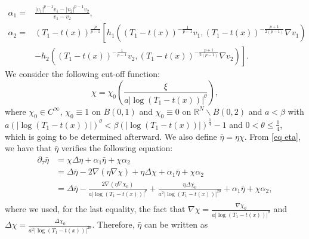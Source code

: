 \documentclass[11pt,a4paper]{article}
\newcommand{\1}{\mathbbm{1}}
\numberwithin{equation}{section}
\newcommand{\numberset}{\mathbb}
\newcommand{\R}{\numberset{R}}
\theoremstyle{remark}
\begin{document}
\begin{equation*}
\begin{split}
\alpha_1=&\frac{|v_1|^{p-1}v_1-|v_2|^{p-1}v_2}{v_1-v_2},\\
\alpha_2=&(T_1-t(x))^{\frac{p}{p-1}}\left[h_1\left((T_1-t(x))^{-\frac{1}{p-1}}v_1,(T_1-t(x))^{-\frac{p+1}{2(p-1)}}\nabla v_1\right)\right.\\
&\left. -h_2\left((T_1-t(x))^{-\frac{1}{p-1}}v_2,(T_1-t(x))^{-\frac{p+1}{2(p-1)}}\nabla v_2\right)\right].
\end{split}
\end{equation*}
We consider the following cut-off function:
\begin{equation}\label{chi a}
\chi=\chi_0\left(\frac{\xi}{a|\log(T_1-t(x))|^{\theta}}\right),
\end{equation}
where $\chi_0\in C^\infty$, $\chi_0\equiv 1$ on $B(0,1)$ and $\chi_0 \equiv 0$ on $\R^N \backslash B(0,2)$ and $a<\beta$ with $a (|\log(T_1-t(x))|)^{\theta}< \beta (|\log(T_1-t(x))|)^{\frac{1}{4}}-1$ and $0<\theta\leq\frac{1}{4}$, which is going to be determined afterward. We also define 
$\bar{\eta}=\eta \chi$. From \eqref{eq eta}, we have that $\bar\eta$ verifies the following equation:
\begin{equation}\label{eq: eta bar}
\begin{split}
\partial_\tau \bar{\eta}&=\chi \Delta \eta+\alpha_1\bar{\eta}+\chi\alpha_2\\
&= \Delta \bar{\eta}-2\nabla(\eta\nabla \chi)+\eta \Delta \chi+\alpha_1\bar{\eta}+\chi\alpha_2\\
&= \Delta \bar{\eta}-\frac{2\nabla(\eta\nabla \chi_0)}{a|\log (T_1-t(x))|^{\theta}}+\frac{\eta \Delta \chi_0}{a^2|\log (T_1-t(x))|^{2\theta}}+\alpha_1\bar{\eta}+\chi\alpha_2,\\
\end{split}
\end{equation}
where we used, for the last equality, the fact that $\nabla \chi=\frac{\nabla \chi_0}{a|\log (T_1-t(x))|^{\theta}}$ and $\Delta \chi=\frac{\Delta \chi_0}{a^2|\log (T_1-t(x))|^{2\theta}}$. Therefore, $\bar \eta$ can be written as
\end{document}

